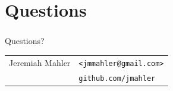 \documentclass[gray]{beamer}
\begin{document}
\section{Questions}
\begin{frame}[fragile]
\frametitle{}
\begin{center}
\vspace{6em}
Questions? \\
\vspace{5em}
\vspace{2em}
\begin{tabular}{ll}
Jeremiah Mahler \quad\quad\quad & \footnotesize\texttt{<jmmahler@gmail.com>} \\
				& \footnotesize\texttt{github.com/jmahler}
\end{tabular}

\end{center}
\end{frame}
\end{document}
